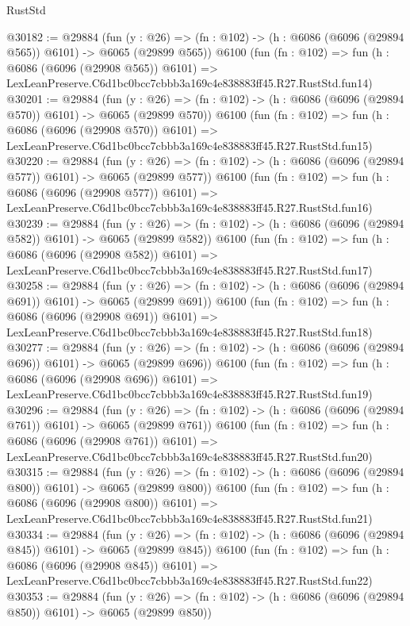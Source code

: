 \begin{lexlean}{RustStd}
\begin{coremodule}
@30182 := @29884
    (fun (y : @26) => (fn : @102) -> (h : @6086 (@6096 (@29894 @565)) @6101) -> @6065 (@29899 @565))
    @6100
    (fun (fn : @102) =>
    fun (h : @6086 (@6096 (@29908 @565)) @6101) =>
    LexLeanPreserve.C6d1bc0bcc7cbbb3a169c4e838883ff45.R27.RustStd.fun14)
@30201 := @29884
    (fun (y : @26) => (fn : @102) -> (h : @6086 (@6096 (@29894 @570)) @6101) -> @6065 (@29899 @570))
    @6100
    (fun (fn : @102) =>
    fun (h : @6086 (@6096 (@29908 @570)) @6101) =>
    LexLeanPreserve.C6d1bc0bcc7cbbb3a169c4e838883ff45.R27.RustStd.fun15)
@30220 := @29884
    (fun (y : @26) => (fn : @102) -> (h : @6086 (@6096 (@29894 @577)) @6101) -> @6065 (@29899 @577))
    @6100
    (fun (fn : @102) =>
    fun (h : @6086 (@6096 (@29908 @577)) @6101) =>
    LexLeanPreserve.C6d1bc0bcc7cbbb3a169c4e838883ff45.R27.RustStd.fun16)
@30239 := @29884
    (fun (y : @26) => (fn : @102) -> (h : @6086 (@6096 (@29894 @582)) @6101) -> @6065 (@29899 @582))
    @6100
    (fun (fn : @102) =>
    fun (h : @6086 (@6096 (@29908 @582)) @6101) =>
    LexLeanPreserve.C6d1bc0bcc7cbbb3a169c4e838883ff45.R27.RustStd.fun17)
@30258 := @29884
    (fun (y : @26) => (fn : @102) -> (h : @6086 (@6096 (@29894 @691)) @6101) -> @6065 (@29899 @691))
    @6100
    (fun (fn : @102) =>
    fun (h : @6086 (@6096 (@29908 @691)) @6101) =>
    LexLeanPreserve.C6d1bc0bcc7cbbb3a169c4e838883ff45.R27.RustStd.fun18)
@30277 := @29884
    (fun (y : @26) => (fn : @102) -> (h : @6086 (@6096 (@29894 @696)) @6101) -> @6065 (@29899 @696))
    @6100
    (fun (fn : @102) =>
    fun (h : @6086 (@6096 (@29908 @696)) @6101) =>
    LexLeanPreserve.C6d1bc0bcc7cbbb3a169c4e838883ff45.R27.RustStd.fun19)
@30296 := @29884
    (fun (y : @26) => (fn : @102) -> (h : @6086 (@6096 (@29894 @761)) @6101) -> @6065 (@29899 @761))
    @6100
    (fun (fn : @102) =>
    fun (h : @6086 (@6096 (@29908 @761)) @6101) =>
    LexLeanPreserve.C6d1bc0bcc7cbbb3a169c4e838883ff45.R27.RustStd.fun20)
@30315 := @29884
    (fun (y : @26) => (fn : @102) -> (h : @6086 (@6096 (@29894 @800)) @6101) -> @6065 (@29899 @800))
    @6100
    (fun (fn : @102) =>
    fun (h : @6086 (@6096 (@29908 @800)) @6101) =>
    LexLeanPreserve.C6d1bc0bcc7cbbb3a169c4e838883ff45.R27.RustStd.fun21)
@30334 := @29884
    (fun (y : @26) => (fn : @102) -> (h : @6086 (@6096 (@29894 @845)) @6101) -> @6065 (@29899 @845))
    @6100
    (fun (fn : @102) =>
    fun (h : @6086 (@6096 (@29908 @845)) @6101) =>
    LexLeanPreserve.C6d1bc0bcc7cbbb3a169c4e838883ff45.R27.RustStd.fun22)
@30353 := @29884
    (fun (y : @26) => (fn : @102) -> (h : @6086 (@6096 (@29894 @850)) @6101) -> @6065 (@29899 @850))

\end{coremodule}
\end{lexlean}
